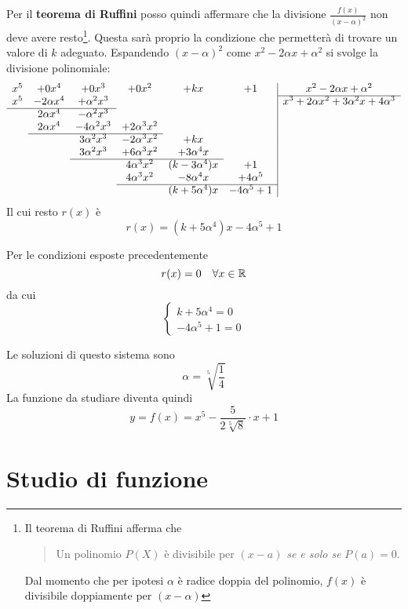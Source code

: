 \documentclass[a4paper, oneside, titlepage, reqno]{book}
\begin{document}
Per il \textbf{teorema di Ruffini}\supercite{blu:1} posso quindi affermare che la divisione $\frac{f(x)}{(x-\alpha)^2}$ non deve avere resto\footnote{Il teorema di Ruffini afferma che
\begin{quotation}
Un polinomio $P(X)$ è divisibile per $(x-a)$ \textit{se e solo se} $P(a)=0$.
\end{quotation}
Dal momento che per ipotesi $\alpha$ è radice doppia del polinomio, $f(x)$ è divisibile doppiamente per $(x-\alpha)$}. Questa sarà proprio la condizione che permetterà di trovare un valore di $k$ adeguato.
Espandendo $(x-\alpha)^2$ come $x^2-2\alpha x+\alpha^2$ si svolge la divisione polinomiale:
\[
\begin{array}{cccccc|c}
x^5 & +0x^4 & +0x^3 & +0x^2 & +kx & +1  & x^2-2\alpha x+\alpha^2\\ \cline{7-7}
x^5 & -2\alpha x^4 & +\alpha^2x^3 & & & & x^3+2\alpha x^2+3\alpha^2x+4\alpha^3\\\cline{1-3}
& 2\alpha x^4 & -\alpha^2x^3 & & & & \\
& 2\alpha x^4 & -4\alpha^2x^3 & +2\alpha^3x^2 & & & \\
\cline{2-4}
& & 3\alpha^2x^3 & -2\alpha^3x^2 &+ kx & & \\
& & 3\alpha^2x^3 & +6\alpha^3x^2 & +3\alpha^4x & & \\
\cline{3-5}
& & & 4\alpha^3x^2 & (k-3\alpha^4)x & + 1& \\
& & & 4\alpha^3x^2 & -8\alpha^4x & +4\alpha^5 & \\
\cline{4-6}
& & & & (k+5\alpha^4)x & -4\alpha^5 + 1& 
\end{array}
\]
Il cui resto $r(x)$ è
\[
r(x)=(k+5\alpha^4)x -4\alpha^5 + 1
\]

Per le condizioni esposte precedentemente
\[
r(x)=0\quad \forall x\in \mathbb{R}
\]
da cui
\[
\begin{cases}
k+5\alpha^4=0\\
-4\alpha^5+1=0
\end{cases}
\]

Le soluzioni di questo sistema sono
\[
\alpha=\sqrt[5]{\frac{1}{4}}
\]
La funzione da studiare diventa quindi
\begin{equation}
y=f(x)=x^5-\frac{5}{2\sqrt[5]{8}}\cdot x+1
\end{equation}

\section{Studio di funzione}
\end{document}
